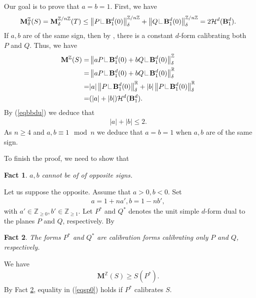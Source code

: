 \documentclass[11pt,a4paper]{amsart}
\numberwithin{equation}{section}
\newcommand{\de}{\delta}
\newcommand\res{\mathop{\hbox{\vrule height 7pt width .3pt depth 0pt
			\vrule height .3pt width 5pt depth 0pt}}\nolimits}
\newcommand{\ms}{\mathbf{M}}
\newcommand{\no}[1]{\left\lVert#1\right\rVert}
\newcommand{\du}{^\ast}
\newcommand{\R}{\mathbb{R}}
\newcommand{\Z}{\mathbb{Z}}
\theoremstyle{plain}
\newtheorem{fact}{Fact}[subsection]
\theoremstyle{definition}
\numberwithin{equation}{subsection}
\begin{document}
Our goal is to prove that $a=b=1.$ First, we have
\begin{align}\label{eqbbdu}
	\ms^\Z_\de(S)=\ms^{\Z/n\Z}_\de(T)\le\no{P\res\mathbf{B}_1^{d}(0)}^{\Z/n\Z}_\de+\no{Q\res\mathbf{B}_1^{d}(0)}^{\Z/n\Z}_\de=2\mathcal{H}^d(\mathbf{B}_1^{d}).
\end{align}
If $a,b$ are of the same sign, then by \cite{GLac,DN}, there is a constant $d$-form calibrating both $P$ and $Q.$ Thus, we have
\begin{align*}
	\ms^\Z(S)=&\no{aP\res\mathbf{B}_1^{d}(0)+bQ\res\mathbf{B}_1^{d}(0)}^{\Z}_\de\\=&\no{aP\res\mathbf{B}_1^{d}(0)+bQ\res\mathbf{B}_1^{d}(0)}^{\R}_\de\\=&|a|\no{P\res\mathbf{B}_1^{d}(0)}^{\R}_\de+|b|\no{P\res\mathbf{B}_1^{d}(0)}^\R_\de\\=&(|a|+|b|)\mathcal{H}^d(\mathbf{B}_1^{d}).
\end{align*}
By (\ref{eqbbdu}) we deduce that
\begin{align*}
	|a|+|b|\le 2.
\end{align*}As $n\ge 4$ and $a,b\equiv 1\mod n$ we deduce that $a=b=1$ when $a,b$ are of the same sign.

To finish the proof, we need to show that 
\begin{fact}\label{fctabimp}
 $a,b$ cannot be of of opposite signs.
\end{fact}Let us suppose the opposite. Assume that $a>0,b<0$. Set
\begin{align*}
	a=1+na',b=1-nb',
\end{align*}with $a'\in\Z_{\ge0},b'\in\Z_{\ge 1}$. Let $P^\ast$ and $Q^\ast$ denotes the unit simple $d$-form dual to the planes $P$ and $Q$, respectively. By \cite[Section II Proposition 7.10]{HL}
\begin{fact}\label{fctpqcal}
	The forms $P^\ast$ and $Q^\ast$ are calibration forms calibrating only $P$ and $Q$, respectively.
\end{fact}
We have
\begin{align}
		\ms^{\Z}(S)\ge S\left(P^\ast\right)\label{eqsp0}.\end{align}
By Fact \ref{fctpqcal},	equality in (\ref{eqsp0}) holds if $P\du$ calibrates $S.$
\end{document}
